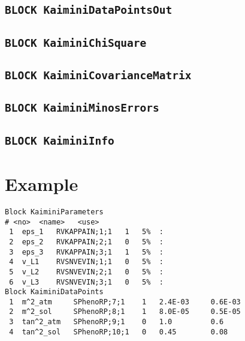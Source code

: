\documentclass[a4paper,12pt]{article}
\newcommand{\ttt}[1]{\texttt{#1}}
\begin{document}
\subsection*{\ttt{BLOCK KaiminiDataPointsOut}}

\subsection*{\ttt{BLOCK KaiminiChiSquare}}

\subsection*{\ttt{BLOCK KaiminiCovarianceMatrix}}

\subsection*{\ttt{BLOCK KaiminiMinosErrors}}

\subsection*{\ttt{BLOCK KaiminiInfo}}


\appendix

\section{Example}

\begin{Verbatim}[frame=single]
Block KaiminiParameters
# <no>  <name>   <use> 
 1  eps_1   RVKAPPAIN;1;1   1   5%  :
 2  eps_2   RVKAPPAIN;2;1   0   5%  :
 3  eps_3   RVKAPPAIN;3;1   1   5%  :
 4  v_L1    RVSNVEVIN;1;1   0   5%  :
 5  v_L2    RVSNVEVIN;2;1   0   5%  :
 6  v_L3    RVSNVEVIN;3;1   0   5%  :
Block KaiminiDataPoints
 1  m^2_atm     SPhenoRP;7;1    1   2.4E-03     0.6E-03
 2  m^2_sol     SPhenoRP;8;1    1   8.0E-05     0.5E-05
 3  tan^2_atm   SPhenoRP;9;1    0   1.0         0.6
 4  tan^2_sol   SPhenoRP;10;1   0   0.45        0.08
\end{Verbatim}

\pagebreak


\nocite{*}
\end{document}
